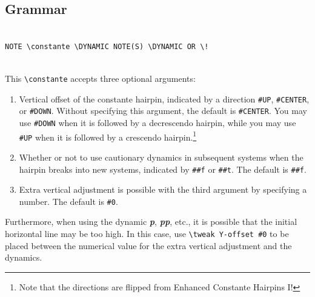 \subsection{Grammar}
\begin{verbatim}

NOTE \constante \DYNAMIC NOTE(S) \DYNAMIC OR \!
 
\end{verbatim}

This \verb|\constante| accepts three optional arguments:
\begin{enumerate}
\item Vertical offset of the constante hairpin, indicated by a direction \verb|#UP|, \verb|#CENTER|, or \verb|#DOWN|. Without specifying this argument, the default is \verb|#CENTER|. You may use \verb|#DOWN| when it is followed by a decrescendo hairpin, while you may use \verb|#UP| when it is followed by a crescendo hairpin.\footnote{Note that the directions are flipped from Enhanced Constante Hairpins I!} 
\item Whether or not to use cautionary dynamics in subsequent systems when the hairpin breaks into new systems, indicated by \verb|##f| or \verb|##t|. The default is \verb|##f|.
\item Extra vertical adjustment is possible with the third argument by specifying a number. The default is \verb|#0|. 
\end{enumerate}

Furthermore, when using the dynamic \textit{\textbf{p}}, \textbf{\textit{pp}}, etc., it is possible that the initial horizontal line may be too high. In this case, use \verb|\tweak Y-offset #0| to be placed between the numerical value for the extra vertical adjustment and the dynamics. 


